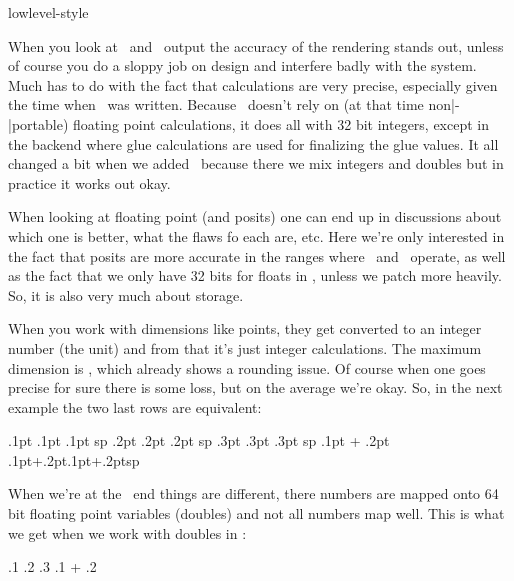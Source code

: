 
\environment lowlevel-style

\startdocument
  [title=accuracy,
   color=darkgray]

\startsectionlevel[title=Introduction]

When you look at \TEX\ and \METAPOST\ output the accuracy of the rendering stands
out, unless of course you do a sloppy job on design and interfere badly with the
system. Much has to do with the fact that calculations are very precise,
especially given the time when \TEX\ was written. Because \TEX\ doesn't rely on
(at that time non|-|portable) floating point calculations, it does all with 32
bit integers, except in the backend where glue calculations are used for
finalizing the glue values. It all changed a bit when we added \LUA\ because
there we mix integers and doubles but in practice it works out okay.

When looking at floating point (and posits) one can end up in discussions about
which one is better, what the flaws fo each are, etc. Here we're only interested
in the fact that posits are more accurate in the ranges where \TEX\ and
\METAPOST\ operate, as well as the fact that we only have 32 bits for floats in
\TEX, unless we patch more heavily. So, it is also very much about storage.

When you work with dimensions like points, they get converted to an integer
number (the  unit) and from that it's just integer calculations. The
maximum dimension is \the\maxdimen, which already shows a rounding issue. Of
course when one goes precise for sure there is some loss, but on the average
we're okay. So, in the next example the two last rows are equivalent:

\starttabulate[|Tr|r|r|]
\NC .1pt        \NC \the\dimexpr.1pt     \relax  \NC \number\dimexpr.1pt     \relax sp \NC \NR
\NC .2pt        \NC \the\dimexpr.2pt     \relax  \NC \number\dimexpr.2pt     \relax sp \NC \NR
\NC .3pt        \NC \the\dimexpr.3pt     \relax  \NC \number\dimexpr.3pt     \relax sp \NC \NR
\NC .1pt + .2pt \NC \the\dimexpr.1pt+.2pt\relax  \NC \number\dimexpr.1pt+.2pt\relax sp \NC \NR
\stoptabulate

When we're at the \LUA\ end things are different, there numbers are mapped onto
64 bit floating point variables (doubles) and not all numbers map well. This is
what we get when we work with doubles in \LUA:

\starttabulate[|Tr|r|]
\NC .1      \NC {}  \NC \NR
\NC .2      \NC {}  \NC \NR
\NC .3      \NC {}  \NC \NR
\NC .1 + .2 \NC {}  \NC \NR
\stoptabulate

